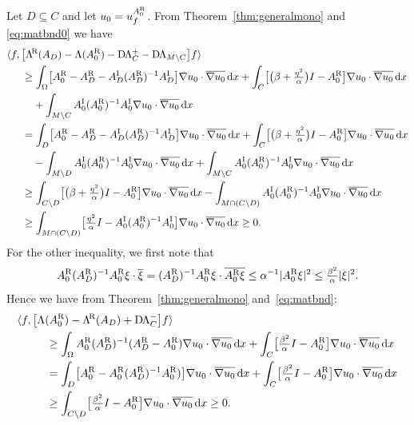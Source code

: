 \documentclass[reqno]{amsart}
\numberwithin{equation}{section}
\numberwithin{figure}{section}
\numberwithin{table}{section}
\theoremstyle{plain}
\theoremstyle{definition}
\theoremstyle{remark}
\newcommand{\abs}[1]{\lvert#1\rvert}
\newcommand{\inner}[1]{\langle#1\rangle}
\newcommand{\di}{\mathrm{d}}   %
\newcommand{\upR}{^{\textup{R}}}
\newcommand{\upI}{^{\textup{I}}}
\newcommand{\uptR}{^{\!\textup{R}}}
\newcommand{\LambdaR}{\Lambda\uptR}
\newcommand{\AR}{A\upR}
\newcommand{\AI}{A\upI}
\newcommand{\DLambda}{\textup{D}\mkern-1.5mu \Lambda}
\begin{document}
	Let $D\subseteq C$ and let $u_0 = u_f^{\AR_0}$. From Theorem~\ref{thm:generalmono} and \eqref{eq:matbnd0} we have
	\begin{align*}
		\inner{f,\bigl[ \LambdaR(A_D)-\Lambda(\AR_0)-\DLambda_C^+ - \DLambda_{M\setminus C} \bigr]f} \hspace{-6cm}&\\
		&\geq \int_\Omega \bigl[ \AR_0 - \AR_D - \AI_D(\AR_D)^{-1}\AI_D \bigr]\nabla u_0\cdot\overline{\nabla u_0}\,\di x + \int_C \bigl[ \bigl(\beta+\tfrac{\eta^2}{\alpha}\bigr)I - \AR_0 \bigr]\nabla u_0\cdot\overline{\nabla u_0}\,\di x \\
		&\phantom{={}}  + \int_{M\setminus C} \AI_0(\AR_0)^{-1}\AI_0\nabla u_0\cdot\overline{\nabla u_0}\,\di x \\
		&= \int_D \bigl[ \AR_0 - \AR_D - \AI_D(\AR_D)^{-1}\AI_D \bigr]\nabla u_0\cdot\overline{\nabla u_0}\,\di x + \int_C \bigl[ \bigl(\beta+\tfrac{\eta^2}{\alpha}\bigr)I - \AR_0 \bigr]\nabla u_0\cdot\overline{\nabla u_0}\,\di x \\
		&\phantom{={}} - \int_{M\setminus D} \AI_0(\AR_0)^{-1}\AI_0\nabla u_0\cdot\overline{\nabla u_0}\,\di x + \int_{M\setminus C} \AI_0(\AR_0)^{-1}\AI_0\nabla u_0\cdot\overline{\nabla u_0}\,\di x \\
		&\geq \int_{C\setminus D} \bigl[ \bigl(\beta+\tfrac{\eta^2}{\alpha}\bigr)I - \AR_0 \bigr]\nabla u_0\cdot\overline{\nabla u_0}\,\di x - \int_{M\cap (C\setminus D)} \AI_0(\AR_0)^{-1}\AI_0\nabla u_0\cdot\overline{\nabla u_0}\,\di x \\
		&\geq \int_{M\cap (C\setminus D)} \bigl[\tfrac{\eta^2}{\alpha}I - \AI_0(\AR_0)^{-1}\AI_0 \bigr] \nabla u_0\cdot\overline{\nabla u_0}\,\di x \geq 0.
	\end{align*}
	For the other inequality, we first note that
	\begin{equation} \label{eq:matbnd}
		\AR_0(\AR_D)^{-1}\AR_0\xi\cdot\overline{\xi} = (\AR_D)^{-1}\AR_0\xi\cdot\overline{\AR_0\xi} \leq \alpha^{-1}\abs{\AR_0\xi}^2\leq \tfrac{\beta^2}{\alpha}\abs{\xi}^2.
	\end{equation}
	Hence we have from Theorem~\ref{thm:generalmono} and~\eqref{eq:matbnd}:
	\begin{align*}
		\inner{f,\bigl[ \Lambda(\AR_0)-\LambdaR(A_D)+\DLambda_C^- \bigr]f} \hspace{-4cm}&\\
		&\geq \int_\Omega \AR_0(\AR_D)^{-1}(\AR_D-\AR_0)\nabla u_0\cdot\overline{\nabla u_0}\,\di x + \int_C \bigl[\tfrac{\beta^2}{\alpha}I-\AR_0\bigr]\nabla u_0\cdot\overline{\nabla u_0}\,\di x \\
		&= \int_D \bigl[\AR_0-\AR_0(\AR_D)^{-1}\AR_0)\bigr]\nabla u_0\cdot\overline{\nabla u_0}\,\di x + \int_C \bigl[\tfrac{\beta^2}{\alpha}I-\AR_0\bigr]\nabla u_0\cdot\overline{\nabla u_0}\,\di x \\
		&\geq \int_{C\setminus D} \bigl[\tfrac{\beta^2}{\alpha}I-\AR_0\bigr]\nabla u_0\cdot\overline{\nabla u_0}\,\di x \geq 0.
	\end{align*}
	
\end{document}
